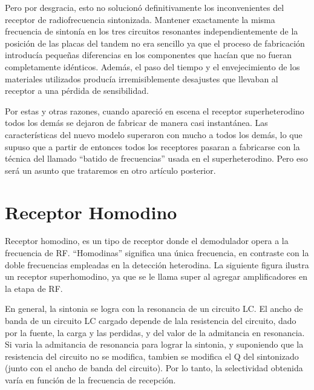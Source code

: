 \documentclass[letterpaper,10pt,spanish]{sphinxmanual}
\let\sphinxpxdimen\pdfpxdimen\else\newdimen\sphinxpxdimen
\begin{document}
Pero por desgracia, esto no solucionó definitivamente los inconvenientes del receptor de radiofrecuencia sintonizada. Mantener exactamente la misma frecuencia de sintonía en los tres circuitos resonantes independientemente de la posición de las placas del tandem no era sencillo ya que el proceso de fabricación introducía pequeñas diferencias en los componentes que hacían que no fueran completamente idénticos. Además, el paso del tiempo y el envejecimiento de los materiales utilizados producía
irremisiblemente desajustes que llevaban al receptor a una pérdida de sensibilidad.

Por estas y otras razones, cuando apareció en escena el receptor superheterodino todos los demás se dejaron de fabricar de manera casi instantánea. Las características del nuevo modelo superaron con mucho a todos los demás, lo que supuso que a partir de entonces todos los receptores pasaran a fabricarse con la técnica del llamado “batido de frecuencias” usada en el superheterodino. Pero eso será un asunto que trataremos en otro artículo posterior.


\chapter{Receptor Homodino}
\label{\detokenize{introduccion/sistemas:Receptor-Homodino}}
Receptor homodino, es un tipo de receptor donde el demodulador opera a la frecuencia de RF. “Homodinas” significa una única frecuencia, en contraste con la doble frecuencias empleadas en la detección heterodina. La siguiente figura ilustra un receptor super\sphinxhyphen{}homodino, ya que se le llama super al agregar amplificadores en la etapa de RF.

\sphinxincludegraphics[width=919\sphinxpxdimen,height=270\sphinxpxdimen]{{homodino}.png}

En general, la sintonia se logra con la resonancia de un circuito LC. El ancho de banda de un circuito LC cargado depende de lala resistencia del circuito, dado por la fuente, la carga y las perdidas, y del valor de la admitancia en resonancia. Si varia la admitancia de resonancia para lograr la sintonia, y suponiendo que la resistencia del circuito no se modifica, tambien se modifica el Q del sintonizado (junto con el ancho de banda del circuito). Por lo tanto, la selectividad obtenida varía en
función de la frecuencia de recepción.

\sphinxincludegraphics[width=919\sphinxpxdimen,height=270\sphinxpxdimen]{{homodino2}.png}
\end{document}
